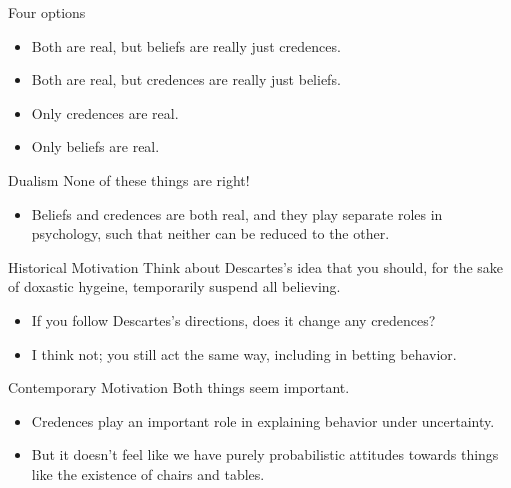 \documentclass[
  17pt,
  letterpaper,
  ignorenonframetext,
  aspectratio=169,
  handout]{beamer}
\providecommand{\tightlist}{%
  \setlength{\itemsep}{0pt}\setlength{\parskip}{0pt}}\usepackage{longtable,booktabs,array}
\begin{document}
\begin{frame}{Four options}
\protect\hypertarget{four-options}{}
\begin{itemize}[<+->]
\tightlist
\item
  Both are real, but beliefs are really just credences.
\item
  Both are real, but credences are really just beliefs.
\item
  Only credences are real.
\item
  Only beliefs are real.
\end{itemize}
\end{frame}

\begin{frame}{Dualism}
\protect\hypertarget{dualism}{}
None of these things are right!

\begin{itemize}[<+->]
\tightlist
\item
  Beliefs and credences are both real, and they play separate roles in
  psychology, such that neither can be reduced to the other.
\end{itemize}
\end{frame}

\begin{frame}{Historical Motivation}
\protect\hypertarget{historical-motivation}{}
Think about Descartes's idea that you should, for the sake of doxastic
hygeine, temporarily suspend all believing.

\begin{itemize}[<+->]
\tightlist
\item
  If you follow Descartes's directions, does it change any credences?
\item
  I think not; you still act the same way, including in betting
  behavior.
\end{itemize}
\end{frame}

\begin{frame}{Contemporary Motivation}
\protect\hypertarget{contemporary-motivation}{}
Both things seem important.

\begin{itemize}[<+->]
\tightlist
\item
  Credences play an important role in explaining behavior under
  uncertainty.
\item
  But it doesn't feel like we have purely probabilistic attitudes
  towards things like the existence of chairs and tables.
\end{itemize}
\end{frame}
\end{document}
